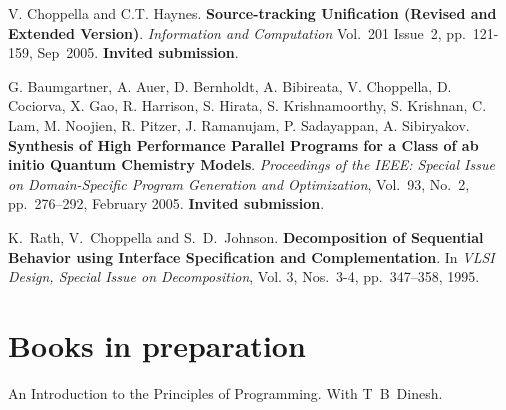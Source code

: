 \documentclass[11pt,margin,line]{res}
\begin{document}
\begin{resume}
V. Choppella and C.T. Haynes.  {\bf Source-tracking
Unification (Revised and Extended Version)}.  {\em
{Information and Computation}} Vol.~201 Issue~2,
pp.~121-159, Sep~2005.  {\bf Invited submission}.

G. Baumgartner, A. Auer, D. Bernholdt, A. Bibireata,
V. Choppella, D. Cociorva, X. Gao, R. Harrison, S. Hirata,
S. Krishnamoorthy, S. Krishnan, C. Lam, M. Noojien,
R. Pitzer, J. Ramanujam, P. Sadayappan, A. Sibiryakov.  {\bf
Synthesis of High Performance Parallel Programs for a Class
of ab initio Quantum Chemistry Models}.  {\em {Proceedings
of the IEEE: Special Issue on Domain-Specific Program
Generation and Optimization}}, Vol.~93, No.~2, pp.~276--292,
February 2005.  {\bf Invited submission}.

K.~Rath, V.~Choppella and S.~D.~Johnson.  {\bf Decomposition
of Sequential Behavior using Interface Specification and
Complementation}.  In {\em {VLSI Design, Special Issue on
Decomposition}}, Vol. 3, Nos.~3-4, pp.~347--358, 1995.



\vspace{2em}





\vspace{2em}

\section{\sc Books in preparation}

An Introduction to the Principles of Programming.  With
T~B~Dinesh.


\end{resume}
\end{document}
